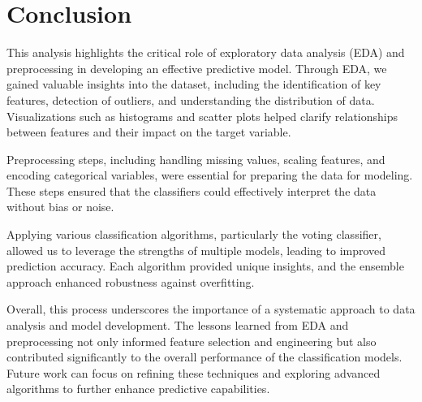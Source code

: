 \documentclass{article}
\begin{document}
\section{Conclusion}
This analysis highlights the critical role of exploratory data analysis (EDA) and preprocessing in developing an effective predictive model. Through EDA, we gained valuable insights into the dataset, including the identification of key features, detection of outliers, and understanding the distribution of data. Visualizations such as histograms and scatter plots helped clarify relationships between features and their impact on the target variable.

Preprocessing steps, including handling missing values, scaling features, and encoding categorical variables, were essential for preparing the data for modeling. These steps ensured that the classifiers could effectively interpret the data without bias or noise.

Applying various classification algorithms, particularly the voting classifier, allowed us to leverage the strengths of multiple models, leading to improved prediction accuracy. Each algorithm provided unique insights, and the ensemble approach enhanced robustness against overfitting.

Overall, this process underscores the importance of a systematic approach to data analysis and model development. The lessons learned from EDA and preprocessing not only informed feature selection and engineering but also contributed significantly to the overall performance of the classification models. Future work can focus on refining these techniques and exploring advanced algorithms to further enhance predictive capabilities.
\end{document}
